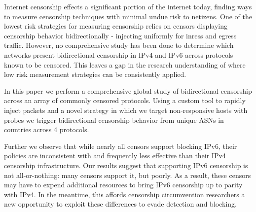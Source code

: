 
Internet censorship effects a significant portion of the internet today, finding
ways to measure censorship techniques with minimal undue risk to netizens.
One of the lowest risk strategies for measuring censorship relies on censors
displaying censorship behavior bidirectionally - injecting uniformly for
inress and egress traffic. However, no comprehensive study has been done to
determine which networks present bidirectional censorship in IPv4 and IPv6
across protocols known to be censored. This leaves a gap in the research
understanding of where low risk measurement strategies can be consistently
applied.

In this paper we perform a comprehensive global study of bidirectional
censorship across an array of commonly censored protocols. Using a custom tool
to rapidly inject packets and a novel strategy in which we target non-responsive
hosts with probes we trigger bidirectional censorship behavior from
 unique ASNs in  countries across 4 protocols.

Further we observe that while nearly all censors support blocking IPv6, their
policies are inconsistent with and frequently less effective than their IPv4
censorship infrastructure. Our results suggest that supporting IPv6 censorship
is not all-or-nothing: many censors support it, but poorly.  As a result, these
censors may have to expend additional resources to bring IPv6 censorship up to
parity with IPv4. In the meantime, this affords censorship circumvention
researchers a new opportunity to exploit these differences to evade detection
and blocking.
